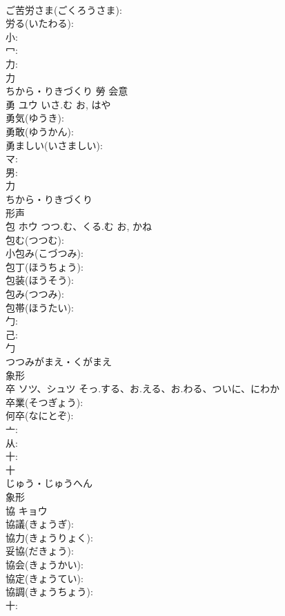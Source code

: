 \documentclass[8pt]{extreport}
\begin{document}
\begin{CJK}{UTF8}{min}
\\	ご苦労さま(ごくろうさま): 
\\	労る(いたわる): 
\\	小: 
\\	冖: 
\\	力: 
\\	力	
\\	ちから・りきづくり	勞	会意 
\\	勇	ユウ	いさ.む	お, はや	
\\	勇気(ゆうき): 
\\	勇敢(ゆうかん): 
\\	勇ましい(いさましい): 
\\	マ: 
\\	男: 
\\	力	
\\	ちから・りきづくり	
\\	形声 
\\	包	ホウ	つつ.む、くる.む	お, かね	
\\	包む(つつむ): 
\\	小包み(こづつみ): 
\\	包丁(ほうちょう): 
\\	包装(ほうそう): 
\\	包み(つつみ): 
\\	包帯(ほうたい): 
\\	勹: 
\\	己: 
\\	勹	
\\	つつみがまえ・くがまえ	
\\	象形 
\\	卒	ソツ、シュツ	そっ.する、お.える、お.わる、ついに、にわか		
\\	卒業(そつぎょう): 
\\	何卒(なにとぞ): 
\\	亠: 
\\	从: 
\\	十: 
\\	十	
\\	じゅう・じゅうへん	
\\	象形 
\\	協	キョウ			
\\	協議(きょうぎ): 
\\	協力(きょうりょく): 
\\	妥協(だきょう): 
\\	協会(きょうかい): 
\\	協定(きょうてい): 
\\	協調(きょうちょう): 
\\	十: 

\end{CJK}
\end{document}
